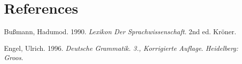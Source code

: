 \documentclass[
  letterpaper,
]{scrbook}
\newlength{\cslhangindent}
\newlength{\cslentryspacingunit} %
\newenvironment{CSLReferences}[2] %
 {%
  \setlength{\parindent}{0pt}
  \ifodd #1
  \let\oldpar\par
  \def\par{\hangindent=\cslhangindent\oldpar}
  \fi
  \setlength{\parskip}{#2\cslentryspacingunit}
 }%
 {}
\begin{document}

\hypertarget{references}{%
\chapter*{References}\label{references}}

\hypertarget{refs}{}
\begin{CSLReferences}{1}{0}
\leavevmode{}%
Bußmann, Hadumod. 1990. \emph{Lexikon Der Sprachwissenschaft}. 2nd ed.
Kr{ö}ner.

\leavevmode{}%
Engel, Ulrich. 1996. \emph{Deutsche Grammatik. 3., Korrigierte Auflage}.
\emph{Heidelberg: Groos}.

\end{CSLReferences}

\hypertarget{section-1}{%
\section*{\texorpdfstring{}{ }}\label{section-1}}


\backmatter

\printindex
\end{document}
